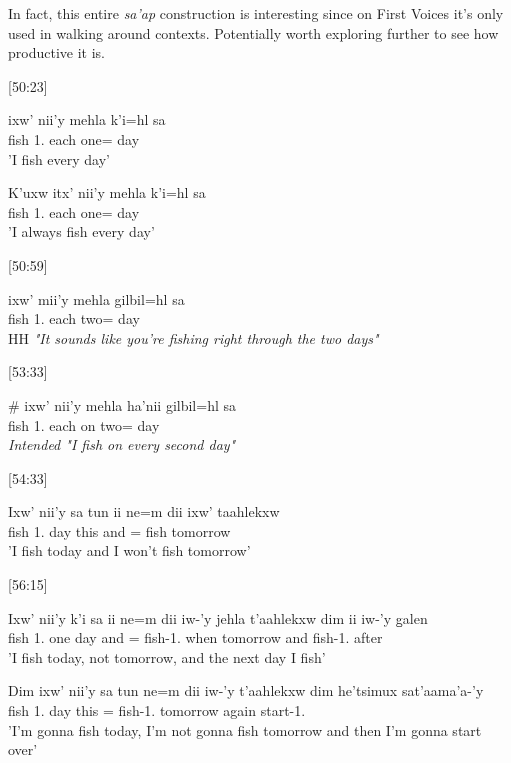 In fact, this entire \textit{sa'ap} construction is interesting since on First Voices it's only used in walking around contexts. Potentially worth exploring further to see how productive it is.

[50:23]
\begin{exe}
\ex \begin{xlist}
\item \gll ixw' nii'y mehla k'i=hl sa\\
fish 1.\Iii{} each one=\Cn{} day\\
'I fish every day'
\item \gll K'uxw itx' nii'y mehla k'i=hl sa\\
\Hab{} fish 1.\Iii{} each one=\Cn{} day\\
'I always fish every day'
\end{xlist}
\end{exe}

[50:59]
\begin{exe}
\ex \gll ixw' mii'y mehla gilbil=hl sa\\
fish 1.\Iii{} each two=\Cn{} day\\
HH \textit{"It sounds like you're fishing right through the two days"}
\end{exe}

[53:33]
\begin{exe}
\ex \gll \# ixw' nii'y mehla ha'nii gilbil=hl sa\\
{} fish 1.\Iii{} each on two=\Cn{} day\\
\textit{Intended "I fish on every second day"}
\end{exe}

[54:33]
\begin{exe}
\ex \gll Ixw' nii'y sa tun ii ne=m dii ixw' taahlekxw\\
fish 1.\Iii{} day this and \Neg{}=\Fut{} \Foc{} fish tomorrow\\
'I fish today and I won't fish tomorrow'
\end{exe}

[56:15]
\begin{exe}
\ex \begin{xlist}
\item \gll Ixw' nii'y k'i sa ii ne=m dii iw-'y jehla t'aahlekxw dim ii iw-'y g̱alen\\
fish 1.\Iii{} one day and \Neg{}=\Fut{} \Foc{} fish-1.\Ii{} when tomorrow \Fut{} and fish-1.\Ii{} after\\
'I fish today, not tomorrow, and the next day I fish'
\item \gll Dim ixw' nii'y sa tun ne=m dii iw-'y t'aahlekxw dim he'tsimux sat'aama'a-'y\\
\Fut{} fish 1.\Iii{} day this \Neg{}=\Fut{} \Foc{} fish-1.\Ii{} tomorrow \Fut{} again start-1.\Ii{}\\
'I'm gonna fish today, I'm not gonna fish tomorrow and then I'm gonna start over'
\end{xlist}
\end{exe}



